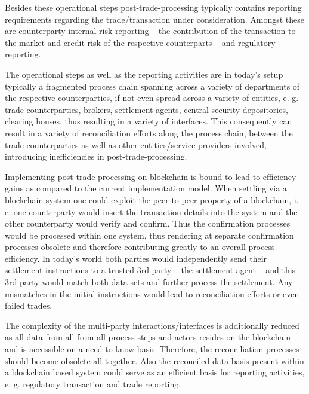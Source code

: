 Besides these operational steps post-trade-processing typically contains reporting requirements regarding the trade/transaction under consideration. Amongst these are counterparty internal risk reporting – the contribution of the transaction to the market and credit risk of the respective counterparts – and regulatory reporting. 

The operational steps as well as the reporting activities are in today’s setup typically a fragmented process chain spanning across a variety of departments of the respective counterparties, if not even spread across a variety of entities, e. g. trade counterparties, brokers, settlement agents, central security depositories, clearing houses, thus resulting in a variety of interfaces. This consequently can result in a variety of reconciliation efforts along the process chain, between the trade counterparties as well as other entities/service providers involved, introducing inefficiencies in post-trade-processing. 
 
Implementing post-trade-processing on blockchain is bound to lead to efficiency gains as compared to the current implementation model. When settling via a blockchain system one could exploit the peer-to-peer property of a blockchain, i. e. one counterparty would insert the transaction details into the system and the other counterparty would verify and confirm.  Thus the confirmation processes would be processed within one system, thus rendering at separate confirmation processes obsolete and therefore contributing greatly to an overall process efficiency. In today’s world both parties would independently send their settlement instructions to a trusted 3rd party – the settlement agent – and this 3rd party would match both data sets and further process the settlement. Any mismatches in the initial instructions would lead to reconciliation efforts or even failed trades.

The complexity of the multi-party interactions/interfaces is additionally reduced as all data from all from all process steps and actors resides on the blockchain and is accessible on a need-to-know basis. Therefore, the reconciliation processes should become obsolete all together. Also the reconciled data basis present within a blockchain based system could serve as an efficient basis for reporting activities, e. g.  regulatory transaction and trade reporting.
 
